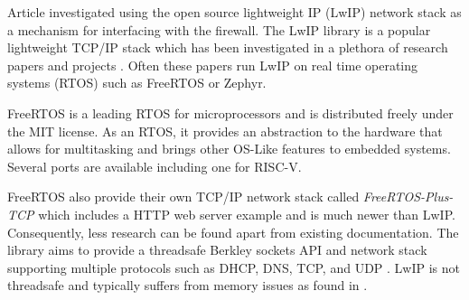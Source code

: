 Article \cite{LwIPFPGAFirewall} investigated using the open source lightweight IP (LwIP) network stack as a mechanism for interfacing with the firewall. 
The LwIP library is a popular lightweight TCP/IP stack which has been investigated in a plethora of research papers and projects \cite{ImprovemntOptimLWIP} 
\cite{OptimCortexLwIP}. Often these papers run LwIP on real time operating systems (RTOS) such as FreeRTOS or Zephyr.

FreeRTOS is a leading RTOS for microprocessors and is distributed freely under the MIT license. As an RTOS, it provides an abstraction to the hardware that allows 
for multitasking and brings other OS-Like features to embedded systems. Several ports are available including one for RISC-V. 

FreeRTOS also provide their own TCP/IP network stack called \textit{FreeRTOS-Plus-TCP} which includes a HTTP web server example and is much newer than LwIP.
Consequently, less research can be found apart from existing documentation. The library aims to provide a threadsafe Berkley sockets API and network stack 
supporting multiple protocols such as DHCP, DNS, TCP, and UDP \cite{FreeRTOSTCP}. LwIP is not threadsafe and typically suffers from memory issues as found 
in \cite{OptimCortexLwIP}.


